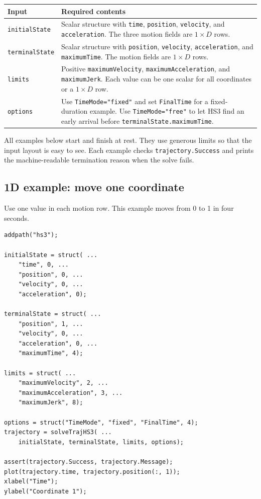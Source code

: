 \documentclass[10pt,letterpaper]{article}
\newcommand{\file}[1]{\nolinkurl{#1}}
\begin{document}
\begin{center}
\begin{tabularx}{0.96\linewidth}{@{}lX@{}}
\toprule
Input & Required contents \\
\midrule
\file{initialState} & Scalar structure with \file{time}, \file{position},
\file{velocity}, and \file{acceleration}. The three motion fields are
$1\times D$ rows. \\
\file{terminalState} & Scalar structure with \file{position}, \file{velocity},
\file{acceleration}, and \file{maximumTime}. The motion fields are
$1\times D$ rows. \\
\file{limits} & Positive \file{maximumVelocity},
\file{maximumAcceleration}, and \file{maximumJerk}. Each value can be one
scalar for all coordinates or a $1\times D$ row. \\
\file{options} & Use \file{TimeMode="fixed"} and set \file{FinalTime} for a
fixed-duration example. Use \file{TimeMode="free"} to let HS3 find an early
arrival before \file{terminalState.maximumTime}. \\
\bottomrule
\end{tabularx}
\end{center}

All examples below start and finish at rest. They use generous limits so that
the input layout is easy to see. Each example checks \file{trajectory.Success}
and prints the machine-readable termination reason when the solve fails.

\subsection{1D example: move one coordinate}

Use one value in each motion row. This example moves from 0 to 1 in four
seconds.

\begin{lstlisting}
addpath("hs3");

initialState = struct( ...
    "time", 0, ...
    "position", 0, ...
    "velocity", 0, ...
    "acceleration", 0);

terminalState = struct( ...
    "position", 1, ...
    "velocity", 0, ...
    "acceleration", 0, ...
    "maximumTime", 4);

limits = struct( ...
    "maximumVelocity", 2, ...
    "maximumAcceleration", 3, ...
    "maximumJerk", 8);

options = struct("TimeMode", "fixed", "FinalTime", 4);
trajectory = solveTrajHS3( ...
    initialState, terminalState, limits, options);

assert(trajectory.Success, trajectory.Message);
plot(trajectory.time, trajectory.position(:, 1));
xlabel("Time");
ylabel("Coordinate 1");
\end{lstlisting}
\end{document}

